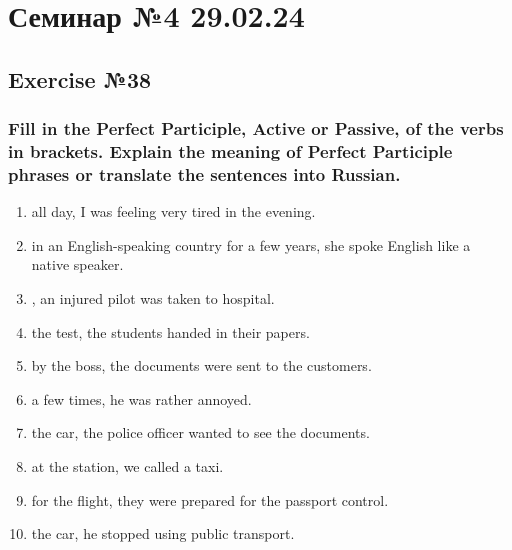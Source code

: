 \chapter{Семинар №4 29.02.24}

\section{Exercise №38}
\subsection*{Fill in the Perfect Participle, Active or Passive, of the verbs in
      brackets. Explain the meaning of Perfect Participle phrases or translate the
      sentences into Russian.}
\begin{enumerate}
      \item {} all day, I was feeling very tired in the evening.
      \item {} in an English-speaking country for a few years, she
            spoke English like a native speaker.
      \item {}, an injured pilot was taken to hospital.
      \item {} the test, the students handed in their papers.
      \item {} by the boss, the documents were sent to the customers.
      \item {} a few times, he was rather annoyed.
      \item {} the car, the police officer wanted to see the documents.
      \item {} at the station, we called a taxi.
      \item {} for the flight, they were prepared for the passport
            control.
      \item {} the car, he stopped using public transport.
\end{enumerate}

